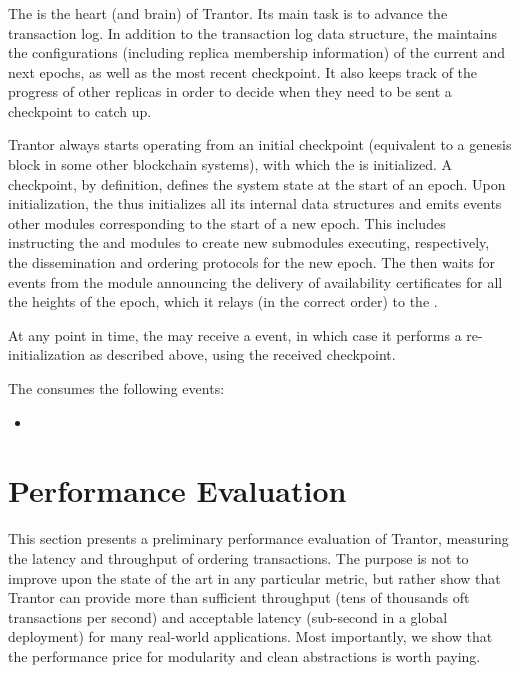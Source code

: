 \documentclass{article}
\begin{document}
\subsubsection{}

The  is the heart (and brain) of Trantor.
Its main task is to advance the transaction log.
In addition to the transaction log data structure, the  maintains the configurations
(including replica membership information) of the current and  next epochs,
as well as the most recent checkpoint.
It also keeps track of the progress of other replicas in order to decide when they need to be sent a checkpoint to catch up.

Trantor always starts operating from an initial checkpoint (equivalent to a genesis block in some other blockchain systems),
with which the  is initialized.
A checkpoint, by definition, defines the system state at the start of an epoch.
Upon initialization, the  thus initializes all its internal data structures
and emits events other modules corresponding to the start of a new epoch.
This includes instructing the  and  modules to create new submodules
executing, respectively, the dissemination and ordering protocols for the new epoch.
The  then waits for events from the  module announcing the delivery of availability certificates
for all the heights of the epoch, which it relays (in the correct order) to the .

At any point in time, the  may receive a  event,
in which case it performs a re-initialization as described above, using the received checkpoint.

The  consumes the following events:
\begin{itemize}
    \item 
\end{itemize}

\section{Performance Evaluation}
\label{sec:evaluation}

This section presents a preliminary performance evaluation of Trantor, measuring the latency and throughput of ordering transactions.
The purpose is not to improve upon the state of the art in any particular metric,
but rather show that Trantor can provide more than sufficient throughput (tens of thousands oft transactions per second)
and acceptable latency (sub-second in a global deployment) for many real-world applications.
Most importantly, we show that the performance price for modularity and clean abstractions is worth paying.
\end{document}
